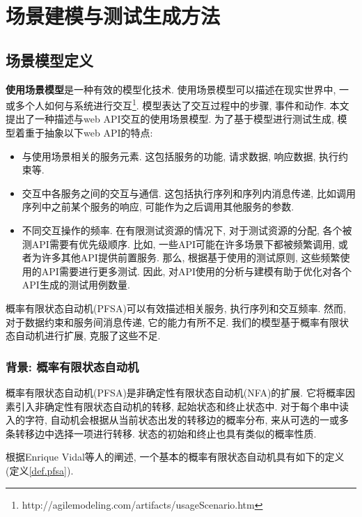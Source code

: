 \chapter{场景建模与测试生成方法}
    \section{场景模型定义}
        \textbf{使用场景模型}是一种有效的模型化技术. 使用场景模型可以描述在现实世界中, 一或多个人如何与系统进行交互\footnote{http://agilemodeling.com/artifacts/usageScenario.htm}. 模型表达了交互过程中的步骤, 事件和动作. 本文提出了一种描述与web API交互的使用场景模型. 为了基于模型进行测试生成, 模型着重于抽象以下web API的特点:
        
        \begin{itemize}
            \item 与使用场景相关的服务元素. 这包括服务的功能, 请求数据, 响应数据, 执行约束等.
            
            \item 交互中各服务之间的交互与通信. 这包括执行序列和序列内消息传递, 比如调用序列中之前某个服务的响应, 可能作为之后调用其他服务的参数.
            
            \item 不同交互操作的频率. 在有限测试资源的情况下, 对于测试资源的分配, 各个被测API需要有优先级顺序. 比如, 一些API可能在许多场景下都被频繁调用, 或者为许多其他API提供前置服务. 那么, 根据基于使用的测试原则, 这些频繁使用的API需要进行更多测试. 因此, 对API使用的分析与建模有助于优化对各个API生成的测试用例数量.
        \end{itemize}
        
        概率有限状态自动机(PFSA)可以有效描述相关服务, 执行序列和交互频率. 然而, 对于数据约束和服务间消息传递, 它的能力有所不足. 我们的模型基于概率有限状态自动机进行扩展, 克服了这些不足.
        
        \subsection{背景: 概率有限状态自动机}
        
            概率有限状态自动机(PFSA)是非确定性有限状态自动机(NFA)的扩展. 它将概率因素引入非确定性有限状态自动机的转移, 起始状态和终止状态中. 对于每个串中读入的字符, 自动机会根据从当前状态出发的转移边的概率分布, 来从可选的一或多条转移边中选择一项进行转移. 状态的初始和终止也具有类似的概率性质.
            
            根据Enrique Vidal等人的阐述\cite{enriquev05}, 一个基本的概率有限状态自动机具有如下的定义(定义\ref{def.pfsa}).
            
